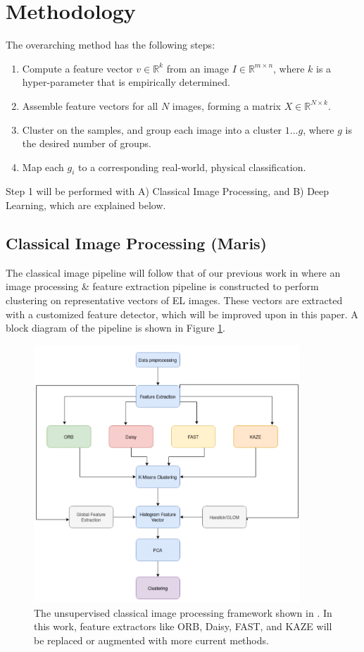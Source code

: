 \documentclass[12pt]{article}
\newcommand{\R}{\mathbb{R}}
\begin{document}
\section{Methodology}
The overarching method has the following steps:
\begin{enumerate}
    \item Compute a feature vector $v \in \R^k$ from an image $I \in \R^{m \times n}$, where $k$ is a hyper-parameter that is empirically determined. 
    \item Assemble feature vectors for all $N$ images, forming a matrix $X \in \R^{N \times k}$.
    \item Cluster on the samples, and group each image into a cluster $1...g$, where $g$ is the desired number of groups.
    \item Map each $g_i$ to a corresponding real-world, physical classification.
\end{enumerate}
Step 1 will be performed with A) Classical Image Processing, and B) Deep Learning, which are explained below.
\subsection{Classical Image Processing (Maris)}
The classical image pipeline will follow that of our previous work in \cite{pierce_identifying_2020} where an image processing \& feature extraction pipeline is constructed to perform clustering on representative vectors of EL images. 
These vectors are extracted with a customized feature detector, which will be improved upon in this paper.
A block diagram of the pipeline is shown in Figure \ref{fig:pipeline}.
\begin{figure}[h]
    \includegraphics[width=10cm]{pipeline.png}
    \centering
    \caption{The unsupervised classical image processing framework shown in \cite{pierce_identifying_2020}. In this work, feature extractors like ORB, Daisy, FAST, and KAZE will be replaced or augmented with more current methods.}
\label{fig:pipeline}
\end{figure}
\end{document}
